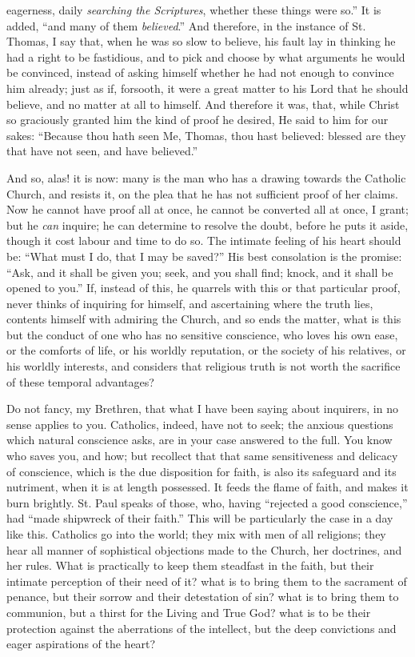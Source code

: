 eagerness, daily \emph{searching the Scriptures}, whether
these things were so.'' It is added, ``and many
of them \emph{believed}.'' And therefore, in the
instance of St. Thomas, I say that, when he was so slow
to believe, his fault lay in thinking he had a right to
be fastidious, and to pick and choose by what arguments
he would be convinced, instead of asking himself whether
he had not enough to convince him already; just as if,
forsooth, it were a great matter to his Lord that he
should believe, and no matter at all to himself. And
therefore it was, that, while Christ so graciously
granted him the kind of proof he desired, He said to him
for our sakes: ``Because thou hath seen Me, Thomas,
thou hast believed: blessed are they that have not seen,
and have believed.''

And so, alas! it is now: many is the man who has a
drawing towards the Catholic Church, and resists it, on
the plea that he has not sufficient proof of her claims.
Now he cannot have proof all at once, he cannot be
converted all at once, I grant; but he \emph{can}
inquire; he can determine to resolve the doubt, before he
puts it aside, though it cost labour and time to do so.
The intimate feeling of his heart should be: ``What
must I do, that I may be saved?'' His best
consolation is the promise: ``Ask, and it shall be
given you; seek, and you shall find; knock, and it shall
be opened to you.'' If, instead of this, he quarrels
with this or that particular proof, never thinks of
inquiring for himself, and ascertaining where the truth
lies, contents himself with admiring the Church, and so
ends the matter, what is this but the conduct of one who
has no sensitive conscience, who loves his own ease, or
the comforts of life, or his worldly reputation, or the
society of his relatives, or his worldly interests, and
considers that religious truth is not worth the sacrifice
of these temporal advantages?

Do not fancy, my Brethren, that what I have been
saying about inquirers, in no sense applies to you.
Catholics, indeed, have not to seek; the anxious
questions which natural conscience asks, are in your case
answered to the full. You know who saves you, and how;
but recollect that that same sensitiveness and delicacy
of conscience, which is the due disposition for faith, is
also its safeguard and its nutriment, when it is at
length possessed. It feeds the flame of faith, and makes
it burn brightly. St. Paul speaks of those, who, having
``rejected a good conscience,'' had ``made
shipwreck of their faith.'' This will be particularly
the case in a day like this. Catholics go into the world;
they mix with men of all religions; they hear all manner
of sophistical objections made to the Church, her
doctrines, and her rules. What is practically to keep
them steadfast in the faith, but their intimate
perception of their need of it? what is to bring them to
the sacrament of penance, but their sorrow and their
detestation of sin? what is to bring them to communion,
but a thirst for the Living and True God? what is to be their protection against the aberrations of the
intellect, but the deep convictions and eager aspirations
of the heart?

